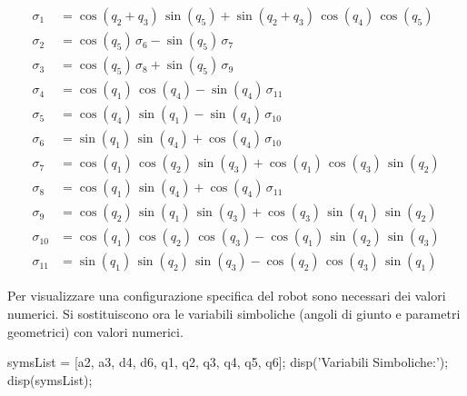 \documentclass[11pt, a4paper]{article}
\begin{document}
\begin{matlabsymbolicoutput}
\[
\begin{aligned}
\sigma_1 &= \cos \left(q_2 +q_3 \right)\,\sin \left(q_5 \right)+\sin \left(q_2 +q_3 \right)\,\cos \left(q_4 \right)\,\cos \left(q_5 \right) \\
\sigma_2 &= \cos \left(q_5 \right)\,\sigma_6 -\sin \left(q_5 \right)\,\sigma_7 \\
\sigma_3 &= \cos \left(q_5 \right)\,\sigma_8 +\sin \left(q_5 \right)\,\sigma_9 \\
\sigma_4 &= \cos \left(q_1 \right)\,\cos \left(q_4 \right)-\sin \left(q_4 \right)\,\sigma_{11} \\
\sigma_5 &= \cos \left(q_4 \right)\,\sin \left(q_1 \right)-\sin \left(q_4 \right)\,\sigma_{10} \\
\sigma_6 &= \sin \left(q_1 \right)\,\sin \left(q_4 \right)+\cos \left(q_4 \right)\,\sigma_{10} \\
\sigma_7 &= \cos \left(q_1 \right)\,\cos \left(q_2 \right)\,\sin \left(q_3 \right)+\cos \left(q_1 \right)\,\cos \left(q_3 \right)\,\sin \left(q_2 \right) \\
\sigma_8 &= \cos \left(q_1 \right)\,\sin \left(q_4 \right)+\cos \left(q_4 \right)\,\sigma_{11} \\
\sigma_9 &= \cos \left(q_2 \right)\,\sin \left(q_1 \right)\,\sin \left(q_3 \right)+\cos \left(q_3 \right)\,\sin \left(q_1 \right)\,\sin \left(q_2 \right) \\
\sigma_{10} &= \cos \left(q_1 \right)\,\cos \left(q_2 \right)\,\cos \left(q_3 \right)-\cos \left(q_1 \right)\,\sin \left(q_2 \right)\,\sin \left(q_3 \right) \\
\sigma_{11} &= \sin \left(q_1 \right)\,\sin \left(q_2 \right)\,\sin \left(q_3 \right)-\cos \left(q_2 \right)\,\cos \left(q_3 \right)\,\sin \left(q_1 \right)
\end{aligned}
\]
\end{matlabsymbolicoutput}

\begin{par}
\begin{flushleft}
Per visualizzare una configurazione specifica del robot sono necessari dei valori numerici. Si sostituiscono ora le variabili simboliche (angoli di giunto e parametri geometrici) con valori numerici.
\end{flushleft}
\end{par}

\begin{matlabcode}
symsList = [a2, a3, d4, d6, q1, q2, q3, q4, q5, q6];
disp('Variabili Simboliche:');
disp(symsList);
\end{matlabcode}
\end{document}
